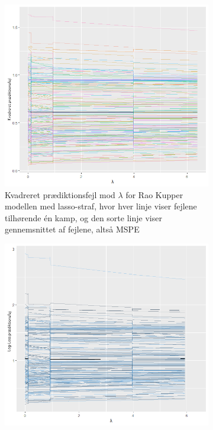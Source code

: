 \documentclass[11pt,a4paper]{article}
\begin{document}
\begin{figure}[htb!]
  \centering
  \begin{subfigure}[b]{0.4\textwidth}
        \includegraphics[width=\textwidth]{MSPESTATISK1.png}
    \caption{Kvadreret prædiktionsfejl mod $\lambda$ for Rao Kupper modellen med lasso-straf, hvor hver linje viser fejlene tilhørende én kamp, og den sorte linje viser gennemsnittet af fejlene, altså MSPE}
    \label{fig:MSPEStat}
  \end{subfigure}
  \hspace{0.2cm}
  \begin{subfigure}[b]{0.4\textwidth}
    \includegraphics[width=\textwidth]{LOGLOSSSTATISK1.png}

\end{subfigure}
\end{figure}
\end{document}

